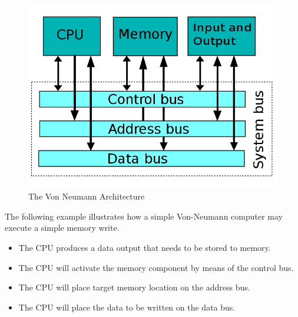 \documentclass[10pt,a4paper]{article}
\begin{document}
\begin{figure}
\caption{The Von Neumann Architecture \cite{IMGVON}}
\begin{center}
\includegraphics[scale=0.35]{../images/von-neumann.png}
\end{center}
\end{figure}

The following example illustrates how a simple Von-Neumann computer may execute a simple memory write. 
\begin{itemize}
	\item The CPU produces a data output that needs to be stored to memory. 
	\item The CPU will activate the memory component by means of the control bus. 
	\item The CPU will place target memory location on the address bus. 
	\item The CPU will place the data to be written on the data bus. 
\end{itemize} 
\end{document}
